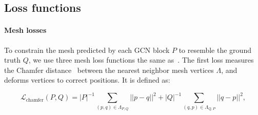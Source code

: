 %

\subsection{Loss functions}
\label{subsec:losses}

\paragraph{Mesh losses}
To constrain the mesh predicted by each GCN block $P$ to resemble the ground truth $Q$, we use three mesh loss functions the same as~\cite{wang2018pixel2mesh}.
The first loss measures the Chamfer distance~\cite{fan2017point} between the nearest neighbor mesh vertices $\Lambda$, and deforms vertices to correct positions. 
It is defined as:

\begin{footnotesize}
\begin{equation}
\mathcal{L}_{\text{chamfer}}(P, Q) = |P|^{-1} \!\!\!\!\!\!\!\!\sum_{(p, q) \in \Lambda_{P,Q}}\!\!\!\!\!\!\!\!{||p-q||^{2}} + |Q|^{-1} \!\!\!\!\!\!\!\!\sum_{(q, p) \in \Lambda_{Q,P}}\!\!\!\!\!\!\!\!{||q-p||^{2}},
\end{equation}
\end{footnotesize}

